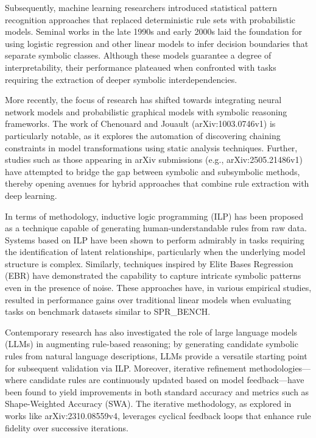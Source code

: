 \documentclass{article}
\begin{document}
Subsequently, machine learning researchers introduced statistical pattern recognition approaches that replaced deterministic rule sets with probabilistic models. Seminal works in the late 1990s and early 2000s laid the foundation for using logistic regression and other linear models to infer decision boundaries that separate symbolic classes. Although these models guarantee a degree of interpretability, their performance plateaued when confronted with tasks requiring the extraction of deeper symbolic interdependencies.

More recently, the focus of research has shifted towards integrating neural network models and probabilistic graphical models with symbolic reasoning frameworks. The work of Chenouard and Jouault (arXiv:1003.0746v1) is particularly notable, as it explores the automation of discovering chaining constraints in model transformations using static analysis techniques. Further, studies such as those appearing in arXiv submissions (e.g., arXiv:2505.21486v1) have attempted to bridge the gap between symbolic and subsymbolic methods, thereby opening avenues for hybrid approaches that combine rule extraction with deep learning.

In terms of methodology, inductive logic programming (ILP) has been proposed as a technique capable of generating human-understandable rules from raw data. Systems based on ILP have been shown to perform admirably in tasks requiring the identification of latent relationships, particularly when the underlying model structure is complex. Similarly, techniques inspired by Elite Bases Regression (EBR) have demonstrated the capability to capture intricate symbolic patterns even in the presence of noise. These approaches have, in various empirical studies, resulted in performance gains over traditional linear models when evaluating tasks on benchmark datasets similar to SPR\_BENCH.

Contemporary research has also investigated the role of large language models (LLMs) in augmenting rule-based reasoning; by generating candidate symbolic rules from natural language descriptions, LLMs provide a versatile starting point for subsequent validation via ILP. Moreover, iterative refinement methodologies—where candidate rules are continuously updated based on model feedback—have been found to yield improvements in both standard accuracy and metrics such as Shape-Weighted Accuracy (SWA). The iterative methodology, as explored in works like arXiv:2310.08559v4, leverages cyclical feedback loops that enhance rule fidelity over successive iterations.
\end{document}
